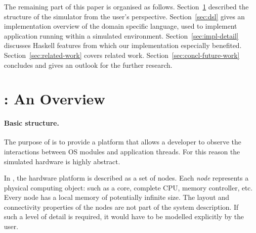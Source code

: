 The remaining part of this paper is organised as follows.
Section~\ref{sec:soosim-an-overview} described the structure of the \soosim simulator from the user's perspective.
Section~\ref{sec:dsl} gives an implementation overview of the domain specific language, used to implement application running within a \soosim simulated environment.
Section~\ref{sec:impl-detail} discusses Haskell features from which our implementation especially benefited.
Section~\ref{sec:related-work} covers related work.
Section~\ref{sec:concl-future-work} concludes and gives an outlook for the further research.

%

\section{\soosim: An Overview}
\label{sec:soosim-an-overview}

\paragraph{Basic structure.}
The purpose of \soosim is to provide a platform that allows a developer to observe the interactions between OS modules and application threads.
For this reason the simulated hardware is highly abstract.

In \soosim, the hardware platform is described as a set of nodes.
Each \emph{node} represents a physical computing object: such as a core, complete CPU, memory controller, etc.
Every node has a local memory of potentially infinite size.
The layout and connectivity properties of the nodes are not part of the system description.
If such a level of detail is required, it would have to be modelled explicitly by the user.  


